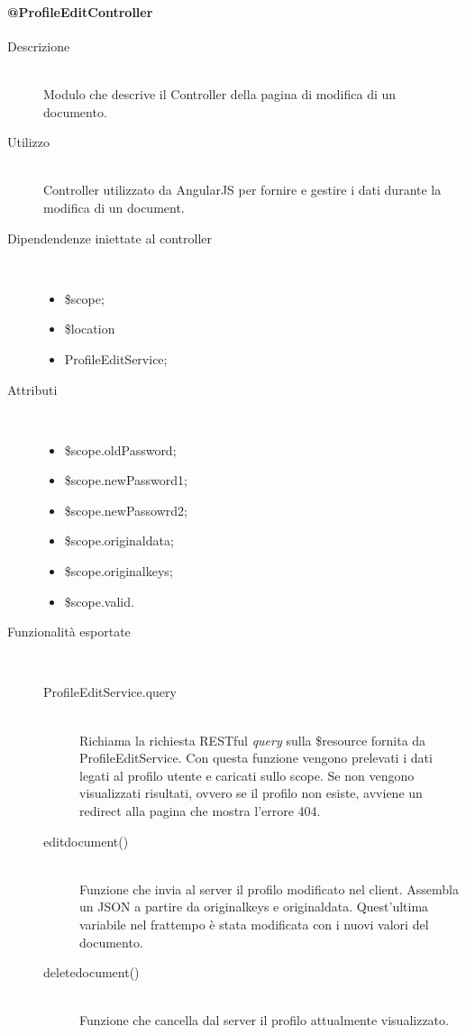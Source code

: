 \paragraph{@ProfileEditController}
\begin{description}
 \item[Descrizione] \hfill \\
 Modulo che descrive il Controller della pagina di modifica di un documento.
 
 \item[Utilizzo] \hfill \\
 Controller utilizzato da AngularJS per fornire e gestire i dati durante la modifica di un document.
 
 \item[Dipendendenze iniettate al controller] \hfill \\
 \begin{itemize}
  \item \$scope;
  \item \$location
  \item ProfileEditService;
  
 \end{itemize}
 
 \item[Attributi] \hfill \\
 \begin{itemize}
 \item  \$scope.oldPassword;
 \item  \$scope.newPassword1;
 \item  \$scope.newPassowrd2;
 \item  \$scope.original\textunderscore data;
 \item \$scope.original\textunderscore keys;
 \item \$scope.valid.
 \end{itemize}
 
 \item[Funzionalità esportate] \hfill \\
 \begin{description}
  \item[ProfileEditService.query] \hfill \\
   Richiama la richiesta RESTful \textit{query} sulla \$resource fornita da ProfileEditService.
  Con questa funzione vengono prelevati i dati legati al profilo utente e caricati sullo scope.
	Se non vengono visualizzati risultati, ovvero se il profilo non esiste, avviene un redirect alla pagina
  che mostra l'errore 404. 
  \item[edit\textunderscore document()] \hfill \\
  Funzione che invia al server il profilo modificato nel client.
  Assembla un JSON a partire da original\textunderscore keys e original\textunderscore data. Quest'ultima variabile nel frattempo è stata 
  modificata con i nuovi valori del documento.
  \item[delete\textunderscore document()] \hfill \\
  Funzione che cancella dal server il profilo attualmente visualizzato.
 \end{description}
\end{description}


